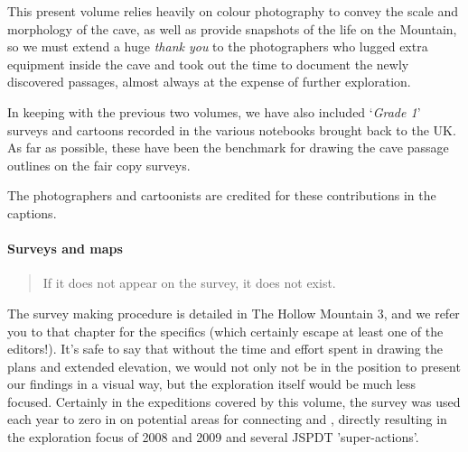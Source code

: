 \begin{tcolorbox}
\begin{fullwidth}
\begin{multicols}{2}
 			This present volume relies heavily on colour photography to convey the scale and morphology of the cave, as well as provide snapshots of the life on the Mountain, so we must extend a huge \textit{thank you} to the photographers who lugged extra equipment inside the cave and took out the time to document the newly discovered passages, almost always at the expense of further exploration. 

 			In keeping with the previous two volumes, we have also included `\textit{Grade 1}' surveys and cartoons recorded in the various notebooks brought back to the UK. As far as possible, these have been the benchmark for drawing the cave passage outlines on the fair copy surveys. 

 			The photographers and cartoonists are credited for these contributions in the captions.


 			\paragraph{Surveys and maps}

 			\begin{quote}If it does not appear on the survey, it does not exist. 
 			\end{quote}
 			The survey making procedure is detailed in The Hollow Mountain 3, and we refer you to that chapter for the specifics (which certainly escape at least one of the editors!). It's safe to say that without the time and effort spent in drawing the plans and extended elevation, we would not only not be in the position to present our findings in a visual way, but the exploration itself would be much less focused. Certainly in the expeditions covered by this volume, the survey was used each year to zero in on potential areas for connecting  and , directly resulting in the exploration focus of 2008 and 2009 and several JSPDT 'super-actions'.



 		\end{multicols}
 	\end{fullwidth}
 \end{tcolorbox}


